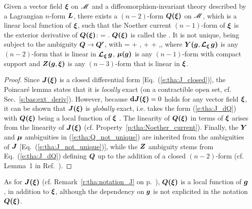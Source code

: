 \begin{prop}
\label{p:tha:Noether_pot_form}
Given a vector field $\bm{\xi}$ on $\mathscr{M}$ and a diffeomorphism-invariant theory described by a Lagrangian $n$-form $\bm{L}$, there exists a $(n-2)$-form $\bm{Q}\textbf{(}\bm{\xi}\textbf{)}$ on $\mathscr{M}$,
which is a linear local function of $\bm{\xi}$, such that
the Noether current $(n-1)$-form of $\bm{\xi}$ is the exterior derivative of $\bm{Q}\textbf{(}\bm{\xi}\textbf{)}$:
\be \label{e:tha:J_dQ}
    \lld\w{\xi}\rld = \dd {}\lld\w{\xi}\rld .
\ee
$\bm{Q}\textbf{(}\bm{\xi}\textbf{)}$ is called the . It is not unique, being subject to the ambiguity
$\bm{Q} \to \bm{Q'}$, with
\be \label{e:tha:Q_not_unique}
    \lld\w{\xi}\rld = \lld\w{\xi}\rld + \lld{},\Lie{\xi}\rld
     + \w{\xi}\cdot\w{\mu}\lld{}\rld + \dd{}\lld{},\w{\xi}\rld ,
\ee
where $\bm{Y}\textbf{(}\bm{g},\bm{\mathcal{L}}_{\bm{\xi}}\,\bm{g}\textbf{)}$ is any $(n-2)$-form that is linear in $\bm{\mathcal{L}}_{\bm{\xi}}\,\bm{g}$, $\bm{\mu}\textbf{(}\bm{g}\textbf{)}$ is any $(n-1)$-form with compact support
and
$\bm{Z}\textbf{(}\bm{g},\bm{\xi}\textbf{)} $ is any $(n-3)$-form that is linear in $\bm{\xi}$.
\end{prop}

\begin{proof}
Since $\bm{J}\textbf{(}\bm{\xi}\textbf{)}$ is a closed differential form [Eq.~(\ref{e:tha:J_closed})], the Poincaré lemma
states that it is \emph{locally} exact (on a contractible open set, cf. Sec.~\ref{s:bas:ext_deriv}). However, because
$\mathbf{d} \bm{J}\textbf{(}\bm{\xi}\textbf{)}  = 0$ holds for any vector field $\bm{\xi}$, it can be shown that
$\bm{J}\textbf{(}\bm{\xi}\textbf{)}$ is \emph{globally} exact, i.e. takes the form (\ref{e:tha:J_dQ})
with $\bm{Q}\textbf{(}\bm{\xi}\textbf{)}$ being a local function of $\bm{\xi}$ \cite{Wald90}.
The linearity of $\bm{Q}\textbf{(}\bm{\xi}\textbf{)}$ in terms of $\bm{\xi}$ arises from the linearity
of $\bm{J}\textbf{(}\bm{\xi}\textbf{)}$ (cf. Property~\ref{p:tha:Noether_current}).
Finally, the $\bm{Y}$ and $\bm{\mu}$ ambiguities in (\ref{e:tha:Q_not_unique}) are inherited from the ambiguities of $\bm{J}$ [Eq.~(\ref{e:tha:J_not_unique})], while the $\bm{Z}$ ambiguity stems from Eq.~(\ref{e:tha:J_dQ}) defining
$\bm{Q}$ up to the addition of a closed $(n-2)$-form (cf. Lemma~1 in Ref.~\cite{Wald90}).
\end{proof}

\begin{remark}
\label{r:tha:notation_Q}
As for $\bm{J}\textbf{(}\bm{\xi}\textbf{)}$ (cf. Remark~\ref{r:tha:notation_J} on p.~\pageref{r:tha:notation_J}), $\bm{Q}\textbf{(}\bm{\xi}\textbf{)}$ is a local function of $\bm{g}$, in addition
to $\bm{\xi}$, although the dependency on $\bm{g}$ is not explicited in the notation
$\bm{Q}\textbf{(}\bm{\xi}\textbf{)}$.
\end{remark}

